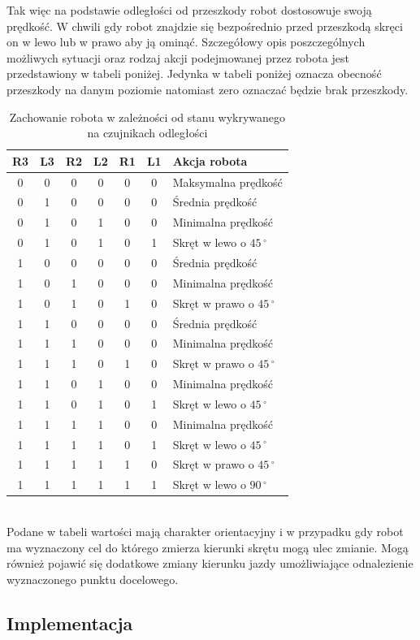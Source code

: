 Tak więc na podstawie odległości od przeszkody robot dostosowuje swoją
prędkość. W chwili gdy robot znajdzie się bezpośrednio przed przeszkodą skręci
on w lewo lub w prawo aby ją ominąć. Szczegółowy opis poszczególnych możliwych
sytuacji oraz rodzaj akcji podejmowanej przez robota jest przedstawiony w
tabeli poniżej. Jedynka w tabeli poniżej oznacza obecność przeszkody na danym
poziomie natomiast zero oznaczać będzie brak przeszkody.
\begin{table}[hb]
\centering
   	\begin{tabular}{ | c | c | c | c | c | c | p{5cm} |} \hline
   		R3 & L3 & R2 & L2 & R1 & L1 & Akcja robota \\ \hline
   		0  & 0  & 0  & 0  & 0  & 0  & Maksymalna prędkość\\ \hline
   		0  & 1  & 0  & 0  & 0  & 0  & Średnia prędkość \\ \hline
   		0  & 1  & 0  & 1  & 0  & 0  & Minimalna prędkość \\ \hline
   		0  & 1  & 0  & 1  & 0  & 1  & Skręt w lewo o $45\,^{\circ}$ \\ \hline 
   		1  & 0  & 0  & 0  & 0  & 0  & Średnia prędkość \\ \hline
   		1  & 0  & 1  & 0  & 0  & 0  & Minimalna prędkość \\ \hline
   		1  & 0  & 1  & 0  & 1  & 0  & Skręt w prawo o $45\,^{\circ}$  \\ \hline
   		1  & 1  & 0  & 0  & 0  & 0  & Średnia prędkość \\ \hline
   		1  & 1  & 1  & 0  & 0  & 0  & Minimalna prędkość \\ \hline
   		1  & 1  & 1  & 0  & 1  & 0  & Skręt w prawo o $45\,^{\circ}$ \\ \hline
   		1  & 1  & 0  & 1  & 0  & 0  & Minimalna prędkość \\ \hline
   		1  & 1  & 0  & 1  & 0  & 1  & Skręt w lewo o $45\,^{\circ}$ \\ \hline 
   		1  & 1  & 1  & 1  & 0  & 0  & Minimalna prędkość \\ \hline 
   		1  & 1  & 1  & 1  & 0  & 1  & Skręt w lewo o $45\,^{\circ}$ \\ \hline 
   		1  & 1  & 1  & 1  & 1  & 0  & Skręt w prawo o $45\,^{\circ}$ \\ \hline 
   		1  & 1  & 1  & 1  & 1  & 1  & Skręt w lewo o $90\,^{\circ}$ \\ \hline
   	\end{tabular}
\caption{Zachowanie robota w zależności od stanu wykrywanego na czujnikach odległości}
\end{table}\\
Podane w tabeli wartości mają charakter orientacyjny i w przypadku gdy robot ma
wyznaczony cel do którego zmierza kierunki skrętu mogą ulec zmianie. Mogą
również pojawić się dodatkowe zmiany kierunku jazdy umożliwiające odnalezienie
wyznaczonego punktu docelowego. 
\subsection{Implementacja}